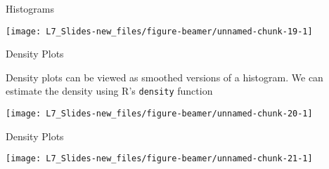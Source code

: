 \documentclass[ignorenonframetext,]{beamer}
\newenvironment{Shaded}{\begin{snugshade}}{\end{snugshade}}
\newcommand{\KeywordTok}[1]{\textcolor{white}{\textbf{{#1}}}}
\newcommand{\NormalTok}[1]{\textcolor{yellow}{{#1}}}
\newcommand{\DataTypeTok}[1]{\textcolor{yellow}{{#1}}}
\newcommand{\StringTok}[1]{\textcolor{yellow}{{#1}}}
\begin{document}
\begin{frame}{Histograms}

\small

\begin{center}\texttt{[image: L7\_Slides-new\_files/figure-beamer/unnamed-chunk-19-1]} \end{center}

\end{frame}

\begin{frame}[fragile]{Density Plots}

Density plots can be viewed as smoothed versions of a histogram. We can
estimate the density using R's \texttt{density} function

\small

\begin{Shaded}
\end{Shaded}

\begin{center}\texttt{[image: L7\_Slides-new\_files/figure-beamer/unnamed-chunk-20-1]} \end{center}

\end{frame}

\begin{frame}[fragile]{Density Plots}

\small

\begin{Shaded}
\end{Shaded}

\begin{center}\texttt{[image: L7\_Slides-new\_files/figure-beamer/unnamed-chunk-21-1]} \end{center}

\end{frame}
\end{document}

